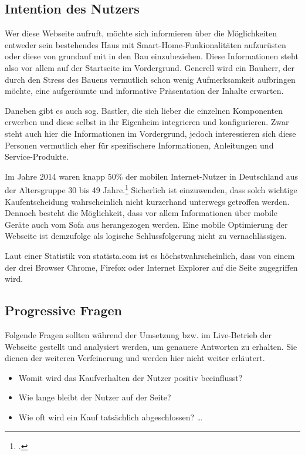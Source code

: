 \subsection{Intention des Nutzers}
Wer diese Webseite aufruft, möchte sich informieren über die Möglichkeiten entweder sein bestehendes Haus mit Smart-Home-Funkionalitäten aufzurüsten oder diese von grundauf mit in den Bau einzubeziehen. Diese Informationen steht also vor allem auf der Startseite im Vordergrund. Generell wird ein Bauherr, der durch den Stress des Bauens vermutlich schon wenig Aufmerksamkeit aufbringen möchte, eine aufgeräumte und informative Präsentation der Inhalte erwarten.

Daneben gibt es auch sog. Bastler, die sich lieber die einzelnen Komponenten erwerben und diese selbst in ihr Eigenheim integrieren und konfigurieren. Zwar steht auch hier die Informationen im Vordergrund, jedoch interessieren sich diese Personen vermutlich eher für spezifischere Informationen, Anleitungen und Service-Produkte.

Im Jahre 2014 waren knapp 50\% der mobilen Internet-Nutzer in Deutschland aus der Altersgruppe 30 bis 49 Jahre.\footcite[vgl.][]{statista:alter} Sicherlich ist einzuwenden, dass solch wichtige Kaufentscheidung wahrscheinlich nicht kurzerhand unterwegs getroffen werden. Dennoch besteht die Möglichkeit, dass vor allem Informationen über mobile Geräte auch vom Sofa aus herangezogen werden. Eine mobile Optimierung der Webseite ist demzufolge als logische Schlussfolgerung nicht zu vernachlässigen. 

Laut einer Statistik von statista.com ist es höchstwahrscheinlich, dass von einem der drei Browser Chrome, Firefox oder Internet Explorer auf die Seite zugegriffen wird. 

\subsection{Progressive Fragen}
Folgende Fragen sollten während der Umsetzung bzw. im Live-Betrieb der Webseite gestellt und analysiert werden, um genauere Antworten zu erhalten. Sie dienen der weiteren Verfeinerung und werden hier nicht weiter erläutert.
\begin{itemize}
	\item Womit wird das Kaufverhalten der Nutzer positiv beeinflusst? 
	\item Wie lange bleibt der Nutzer auf der Seite? 
	\item Wie oft wird ein Kauf tatsächlich abgeschlossen? \ldots
\end{itemize}
